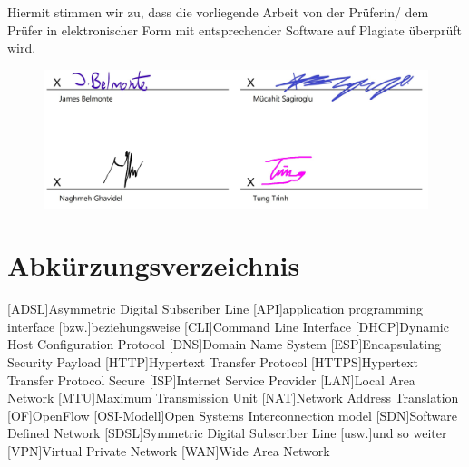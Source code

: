 \documentclass[fontsize=12pt,paper=a4,open=any,parskip=half,
  twoside=false,toc=listof,toc=bibliography,fleqn,leqno,
  captions=nooneline,captions=tableabove,british]{scrbook}
\begin{document}
Hiermit stimmen wir zu, dass die vorliegende Arbeit von der Prüferin/ dem Prüfer in elektronischer Form
mit entsprechender Software auf Plagiate überprüft wird.

\begin{figure}[H]
	\centering
	\includegraphics[width=1\linewidth]{Bilder/unterschrift}
\end{figure}

\tableofcontents
\listoffigures
\listoftables
\lstlistoflistings
\chapter{Abkürzungsverzeichnis}
\begin{acronym}
	[ADSL]{Asymmetric Digital Subscriber Line}
	[API]{application programming interface}
	[bzw.]{beziehungsweise}
	[CLI]{Command Line Interface}
	[DHCP]{Dynamic Host Configuration Protocol}
	[DNS]{Domain Name System}
	[ESP]{Encapsulating Security Payload}
	[HTTP]{Hypertext Transfer Protocol }
	[HTTPS]{Hypertext Transfer Protocol Secure}
	[ISP]{Internet Service Provider}
	[LAN]{Local Area Network}
	[MTU]{Maximum Transmission Unit}
	[NAT]{Network Address Translation}
	[OF]{OpenFlow}
	[OSI-Modell]{Open Systems Interconnection model}
	[SDN]{Software Defined Network}
	[SDSL]{Symmetric Digital Subscriber Line}
	[usw.]{und so weiter}
	[VPN]{Virtual Private Network}
	[WAN]{Wide Area Network}
\end{acronym}


\end{document}
